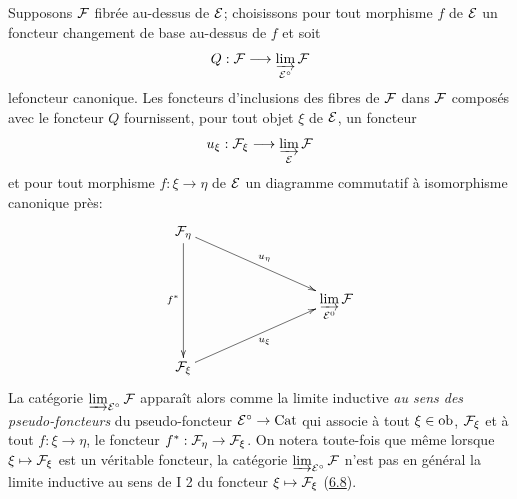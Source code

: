 \documentclass[10pt]{../fichiers-configuration-latex/smfart}
\begin{document}
Supposons ${\mathcal F}$ fibrée au-dessus de ${\mathcal E}$; choisissons
pour tout morphisme $f$ de ${\mathcal E}$ un foncteur changement de base
au-dessus de $f$ et soit
$$
Q :\Ff \to \varinjlim_{\mathcal{E}^{\circ}} \Ff
$$
le\pageoriginale foncteur canonique. Les foncteurs d'inclusions des fibres de
${\mathcal F}$ dans ${\mathcal F}$ composés avec le foncteur $Q$
fournissent, pour tout objet $\xi$ de ${\mathcal E}$, un foncteur
$$
u_{\xi} : \Ff_{\xi} \to \varinjlim_{\mathcal{E}} \Ff
$$
et pour tout morphisme $f : \xi \to \eta$ de ${\mathcal E}$ un
diagramme commutatif à isomorphisme canonique près:
\[
\xymatrix@R=1cm@C=3cm{
\Ff_{\eta} \ar[rd]^{u_{\eta}} \ar[dd]_{f^\ast}&\\
                   &\displaystyle\mathop{\varinjlim}_{\Ee^{0}}\Ff\\
\Ff_{\xi} \ar[ru]_{u_{\xi}} &
}
\]
La catégorie $\varinjlim_{\mathcal{E}^{\circ}} {\mathcal F}$ apparaît alors
comme la limite inductive \emph{au sens des pseudo-foncteurs}
\cite{SGA4-06:5} du pseudo-foncteur $\Ee^{\circ} \to \Cat$ qui associe à
tout $\xi \in \operatorname{ob}$, ${\mathcal F}_{\xi}$ et à tout $f : \xi \to \eta$, le
foncteur $f^{\ast} : \Ff_{\eta} \to \Ff_{\xi}$. On notera toute-fois
que même lorsque $\xi \mapsto {\mathcal F}_{\xi}$ est un véritable foncteur,
la catégorie $\varinjlim_{\mathcal{E}^{\circ}} {\mathcal F}$ n'est pas en
général la limite inductive au sens de I 2 du foncteur $\xi \mapsto
{\mathcal F}_{\xi}$ (\cf \hyperref[VI.exe6.8]{6.8}).
\end{document}
